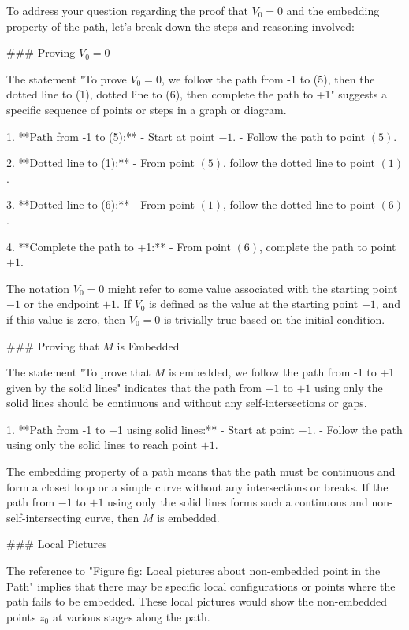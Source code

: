 To address your question regarding the proof that \( V_0 = 0 \) and the embedding property of the path, let's break down the steps and reasoning involved:

### Proving \( V_0 = 0 \)

The statement "To prove \( V_0 = 0 \), we follow the path from -1 to (5), then the dotted line to (1), dotted line to (6), then complete the path to +1" suggests a specific sequence of points or steps in a graph or diagram.

1. **Path from -1 to (5):**
   - Start at point \(-1\).
   - Follow the path to point \((5)\).

2. **Dotted line to (1):**
   - From point \((5)\), follow the dotted line to point \((1)\).

3. **Dotted line to (6):**
   - From point \((1)\), follow the dotted line to point \((6)\).

4. **Complete the path to +1:**
   - From point \((6)\), complete the path to point \(+1\).

The notation \( V_0 = 0 \) might refer to some value associated with the starting point \(-1\) or the endpoint \(+1\). If \( V_0 \) is defined as the value at the starting point \(-1\), and if this value is zero, then \( V_0 = 0 \) is trivially true based on the initial condition.

### Proving that \( M \) is Embedded

The statement "To prove that \( M \) is embedded, we follow the path from -1 to +1 given by the solid lines" indicates that the path from \(-1\) to \(+1\) using only the solid lines should be continuous and without any self-intersections or gaps.

1. **Path from -1 to +1 using solid lines:**
   - Start at point \(-1\).
   - Follow the path using only the solid lines to reach point \(+1\).

The embedding property of a path means that the path must be continuous and form a closed loop or a simple curve without any intersections or breaks. If the path from \(-1\) to \(+1\) using only the solid lines forms such a continuous and non-self-intersecting curve, then \( M \) is embedded.

### Local Pictures

The reference to "Figure fig: Local pictures about non-embedded point in the Path" implies that there may be specific local configurations or points where the path fails to be embedded. These local pictures would show the non-embedded points \( z_0 \) at various stages along the path.

